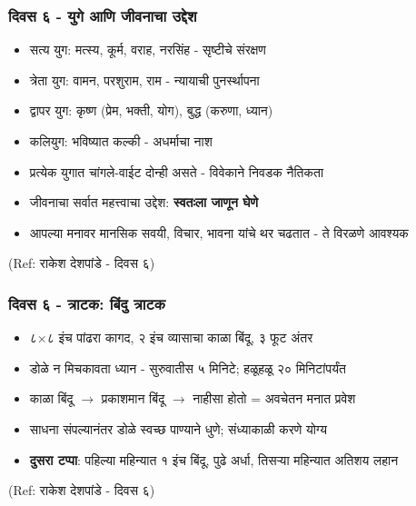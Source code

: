\begin{frame}[fragile]\frametitle{दिवस ६ - युगे आणि जीवनाचा उद्देश}

	\begin{itemize}
	\item सत्य युग: मत्स्य, कूर्म, वराह, नरसिंह - सृष्टीचे संरक्षण
	\item त्रेता युग: वामन, परशुराम, राम - न्यायाची पुनर्स्थापना
	\item द्वापर युग: कृष्ण (प्रेम, भक्ती, योग), बुद्ध (करुणा, ध्यान)
	\item कलियुग: भविष्यात कल्की - अधर्माचा नाश
	\item प्रत्येक युगात चांगले-वाईट दोन्ही असते - विवेकाने निवडक नैतिकता
	\item जीवनाचा सर्वात महत्त्वाचा उद्देश: \textbf{स्वतःला जाणून घेणे}
	\item आपल्या मनावर मानसिक सवयी, विचार, भावना यांचे थर चढतात - ते विरळणे आवश्यक
	\end{itemize}

{\tiny (Ref: राकेश देशपांडे - दिवस ६)}

\end{frame}

\begin{frame}[fragile]\frametitle{दिवस ६ - त्राटक: बिंदु त्राटक}

	\begin{itemize}
	\item ८$\times$८ इंच पांढरा कागद, २ इंच व्यासाचा काळा बिंदू, ३ फूट अंतर
	\item डोळे न मिचकावता ध्यान - सुरुवातीस ५ मिनिटे; हळूहळू २० मिनिटांपर्यंत
	\item काळा बिंदू $\rightarrow$ प्रकाशमान बिंदू $\rightarrow$ नाहीसा होतो = अवचेतन मनात प्रवेश
	\item साधना संपल्यानंतर डोळे स्वच्छ पाण्याने धुणे; संध्याकाळी करणे योग्य
	\item \textbf{दुसरा टप्पा}: पहिल्या महिन्यात १ इंच बिंदू, पुढे अर्धा, तिसऱ्या महिन्यात अतिशय लहान
	\end{itemize}

{\tiny (Ref: राकेश देशपांडे - दिवस ६)}

\end{frame}

